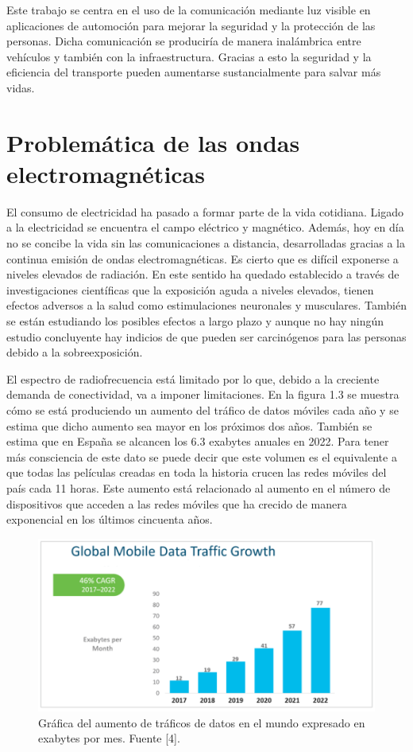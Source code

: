 \newpage
Este trabajo se centra en el uso de la comunicación mediante luz visible en aplicaciones de automoción para mejorar la seguridad y la protección de las personas. Dicha comunicación se produciría de manera inalámbrica entre vehículos y también con la infraestructura. Gracias a esto la seguridad y la eficiencia del transporte pueden aumentarse sustancialmente para salvar más vidas.
\newpage
\section{Problemática de las ondas electromagnéticas}

El consumo de electricidad ha pasado a formar parte de la vida cotidiana. Ligado a la electricidad se encuentra el campo eléctrico y magnético. Además, hoy en día no se concibe la vida sin las comunicaciones a distancia, desarrolladas gracias a la continua emisión de ondas electromagnéticas. Es cierto que es difícil exponerse a niveles elevados de radiación. En este sentido ha quedado establecido a través de investigaciones científicas que la exposición aguda a niveles elevados, tienen efectos adversos a la salud como estimulaciones neuronales y musculares. También se están estudiando los posibles efectos a largo plazo y aunque no hay ningún estudio concluyente hay indicios de que pueden ser carcinógenos para las personas debido a la sobreexposición. \cite{who3}

El espectro de radiofrecuencia está limitado por lo que, debido a la creciente demanda de conectividad, va a imponer limitaciones. En la figura 1.3 se muestra cómo se está produciendo un aumento del tráfico de datos móviles cada año y se estima que dicho aumento sea mayor en los próximos dos años. También se estima que en España se alcancen los 6.3 exabytes anuales en 2022. Para tener más consciencia de este dato se puede decir que este volumen es el equivalente a que todas las películas creadas en toda la historia crucen las redes móviles del país cada 11 horas. Este aumento está relacionado al aumento en el número de dispositivos que acceden a las redes móviles que ha crecido de manera exponencial en los últimos cincuenta años. \cite{khan}

\begin{figure}[ht]
    \centering
    \includegraphics[scale=0.70]{./figuras/data_traffic.png}
    \caption{\small{Gráfica del aumento de tráficos de datos en el mundo expresado en exabytes por mes. Fuente [4].}}
    \label{data_traffic}%
\end{figure}

